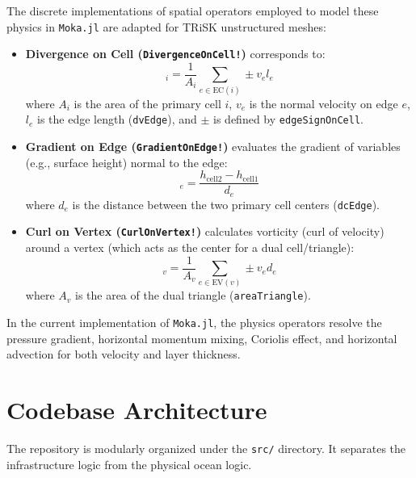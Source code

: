 \documentclass[12pt]{my-preprint}
\begin{document}
The discrete implementations of spatial operators employed to model these physics in \texttt{Moka.jl} are adapted for TRiSK unstructured meshes:

\begin{itemize}
    \item \textbf{Divergence on Cell (\texttt{DivergenceOnCell!})} corresponds to:
    \begin{equation}
        [\nabla \cdot \mathbf{v}]_i = \frac{1}{A_i} \sum_{e \in \text{EC}(i)} \pm v_e l_e
    \end{equation}
    where $A_i$ is the area of the primary cell $i$, $v_e$ is the normal velocity on edge $e$, $l_e$ is the edge length (\texttt{dvEdge}), and $\pm$ is defined by \texttt{edgeSignOnCell}.

    \item \textbf{Gradient on Edge (\texttt{GradientOnEdge!})} evaluates the gradient of variables (e.g., surface height) normal to the edge:
    \begin{equation}
        [\nabla h]_e = \frac{h_{\text{cell2}} - h_{\text{cell1}}}{d_e}
    \end{equation}
    where $d_e$ is the distance between the two primary cell centers (\texttt{dcEdge}).

    \item \textbf{Curl on Vertex (\texttt{CurlOnVertex!})} calculates vorticity (curl of velocity) around a vertex (which acts as the center for a dual cell/triangle):
    \begin{equation}
        [\nabla \times \mathbf{v}]_v = \frac{1}{A_v} \sum_{e \in \text{EV}(v)} \pm v_e d_e
    \end{equation}
    where $A_v$ is the area of the dual triangle (\texttt{areaTriangle}).
\end{itemize}

In the current implementation of \texttt{Moka.jl}, the physics operators resolve the pressure gradient, horizontal momentum mixing, Coriolis effect, and horizontal advection for both velocity and layer thickness.

\section{Codebase Architecture}
The repository is modularly organized under the \texttt{src/} directory. It separates the infrastructure logic from the physical ocean logic.
\end{document}
